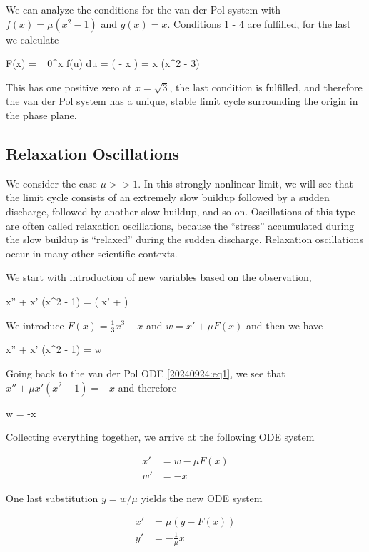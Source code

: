 We can analyze the conditions for the van der Pol system with $f(x) = \mu(x^2 - 1)$ and $g(x) = x$. Conditions 1 - 4 are fulfilled, for the last we calculate

\bee
F(x) = \int_0^x f(u) du = \mu \left(  - x \right) =  \mu x (x^2 - 3)
\eee

This has one positive zero at $x = \sqrt{3}$, the last condition is fulfilled, and therefore the van der Pol system has a unique, stable limit cycle surrounding the origin in the phase plane.

\subsection{Relaxation Oscillations}

We consider the case $\mu >> 1$. In this strongly nonlinear limit, we will see that the limit cycle consists of an extremely slow buildup followed by a sudden discharge, followed by another slow buildup, and so on. Oscillations of this type are often called relaxation oscillations, because the “stress” accumulated during the slow buildup is “relaxed” during the sudden discharge. Relaxation oscillations occur in many other scientific contexts.

We start with introduction of new variables based on the observation,

\bee
x'' + \mu x' (x^2 - 1) =  \left( x' + \mu {} \right)
\eee

We introduce $F(x) = \frac{1}{3} x^3 - x$ and $w = x' + \mu F(x)$ and then we have

\bee
x'' + \mu x' (x^2 - 1) =  w
\eee

Going back to the van der Pol ODE \eqref{20240924:eq1}, we see that $x'' + \mu x' (x^2 - 1) = - x$ and therefore 

\bee
{} w = -x
\eee

Collecting everything together, we arrive at the following ODE system

\begin{align*}
x' &= w - \mu F(x) \\
w' &= -x
\end{align*}

One last substitution $y = w / \mu$ yields the new ODE system

\begin{align*}
x' &= \mu \left( y - F(x) \right) \\
y' &= - \frac{1}{\mu} x
\end{align*}

